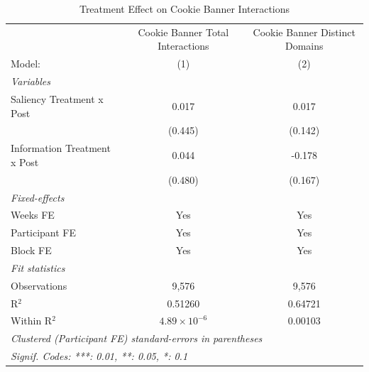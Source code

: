 
\begin{table}[htbp]
   \caption{Treatment Effect on Cookie Banner Interactions}
   \centering
   \begin{tabular}{lcc}
      \tabularnewline \midrule \midrule
                                   & Cookie Banner Total Interactions & Cookie Banner Distinct Domains \\   
      Model:                       & (1)                              & (2)\\  
      \midrule
      \emph{Variables}\\
      Saliency Treatment x Post    & 0.017                            & 0.017\\   
                                   & (0.445)                          & (0.142)\\   
      Information Treatment x Post & 0.044                            & -0.178\\   
                                   & (0.480)                          & (0.167)\\   
      \midrule
      \emph{Fixed-effects}\\
      Weeks FE                     & Yes                              & Yes\\  
      Participant FE               & Yes                              & Yes\\  
      Block FE                     & Yes                              & Yes\\  
      \midrule
      \emph{Fit statistics}\\
      Observations                 & 9,576                            & 9,576\\  
      R$^2$                        & 0.51260                          & 0.64721\\  
      Within R$^2$                 & $4.89\times 10^{-6}$             & 0.00103\\  
      \midrule \midrule
      \multicolumn{3}{l}{\emph{Clustered (Participant FE) standard-errors in parentheses}}\\
      \multicolumn{3}{l}{\emph{Signif. Codes: ***: 0.01, **: 0.05, *: 0.1}}\\
   \end{tabular}
\end{table}


